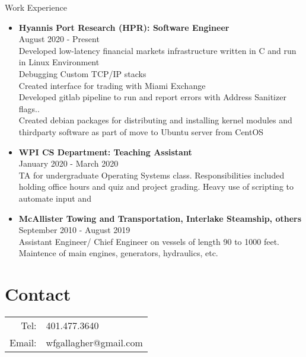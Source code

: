 \documentclass[10pt,a4paper]{article}
\begin{document}
{\begin{tcolorbox}

  {\selectfont
    \begin{center}
      \LARGE{Work Experience}
    \end{center}
  }

  \tcblower

  \begin{itemize}
  \item
    {
      \textbf{Hyannis Port Research (HPR): Software Engineer} \\
      August 2020 - Present \\
      Developed low-latency financial markets infrastructure written in C and run in Linux Environment \\
      Debugging Custom TCP/IP stacks \\
      Created interface for trading with Miami Exchange \\
      Developed gitlab pipeline to run and report errors with Address Sanitizer flags.. \\
      Created debian packages for distributing and installing kernel modules and thirdparty software as part of move to Ubuntu server from CentOS
    }

  \item
    {
      \textbf{WPI CS Department: Teaching Assistant} \\
      January 2020 - March 2020 \\
      TA for undergraduate Operating Systems class. Responsibilities included holding office hours and quiz and project grading. Heavy use of scripting to automate input and
    }

  \item
    {
      \textbf{McAllister Towing and Transportation, Interlake Steamship, others} \\
      September 2010 - August 2019 \\
      Assistant Engineer/ Chief Engineer on vessels of length 90 to 1000 feet. Maintence of main engines, generators, hydraulics, etc.
    }
  \end{itemize}




  \section*{Contact}
  \begin{tabular}{r l}
    Tel: & 401.477.3640 \\
    Email: & wfgallagher@gmail.com \\
  \end{tabular}


\end{tcolorbox}}
\end{document}
